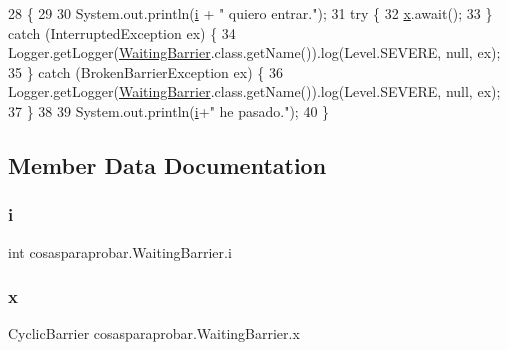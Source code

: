 \begin{DoxyCode}
28                      \{
29         
30         System.out.println(\mbox{\hyperlink{classcosasparaprobar_1_1_waiting_barrier_a6549abdaae9647b2134980d403273773}{i}} + \textcolor{stringliteral}{" quiero entrar."});
31         \textcolor{keywordflow}{try} \{
32             \mbox{\hyperlink{classcosasparaprobar_1_1_waiting_barrier_ac29649ee49c77a7acdd5598806a0c097}{x}}.await();
33         \} \textcolor{keywordflow}{catch} (InterruptedException ex) \{
34             Logger.getLogger(\mbox{\hyperlink{classcosasparaprobar_1_1_waiting_barrier_a0914ceff2faf3ab517feecd074549789}{WaitingBarrier}}.class.getName()).log(Level.SEVERE, null, ex);
35         \} \textcolor{keywordflow}{catch} (BrokenBarrierException ex) \{
36             Logger.getLogger(\mbox{\hyperlink{classcosasparaprobar_1_1_waiting_barrier_a0914ceff2faf3ab517feecd074549789}{WaitingBarrier}}.class.getName()).log(Level.SEVERE, null, ex);
37         \}
38         
39         System.out.println(\mbox{\hyperlink{classcosasparaprobar_1_1_waiting_barrier_a6549abdaae9647b2134980d403273773}{i}}+\textcolor{stringliteral}{" he pasado."});
40     \}
\end{DoxyCode}


\subsection{Member Data Documentation}
\mbox{\label{classcosasparaprobar_1_1_waiting_barrier_a6549abdaae9647b2134980d403273773}} 
\subsubsection{\texorpdfstring{i}{i}}
{\footnotesize\ttfamily int cosasparaprobar.\+Waiting\+Barrier.\+i\hspace{0.3cm}{\ttfamily [package]}}

\mbox{\label{classcosasparaprobar_1_1_waiting_barrier_ac29649ee49c77a7acdd5598806a0c097}} 
\subsubsection{\texorpdfstring{x}{x}}
{\footnotesize\ttfamily Cyclic\+Barrier cosasparaprobar.\+Waiting\+Barrier.\+x\hspace{0.3cm}{\ttfamily [package]}}

